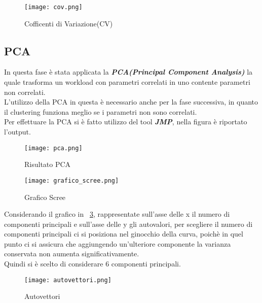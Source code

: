 \begin{figure}[!htbp]
	\texttt{[image: cov.png]}
  \caption{Cofficenti di Variazione(CV)}
  \label{}
\end{figure}

\subsection{PCA}
In questa fase è stata applicata la
\textbf{\textit{PCA(Principal Component Analysis)}}
la quale trasforma un workload con parametri correlati in uno contente parametri
non correlati.\\
L'utilizzo della PCA in questa è necessario anche per la fase successiva, in
quanto il clustering funziona meglio se i parametri non sono correlati.\\
Per effettuare la PCA si è fatto utilizzo del tool \textit{\textbf{JMP}}, nella
figura è riportato l'output.\\

\begin{figure}[!htbp]
	\texttt{[image: pca.png]}
  \caption{Risultato PCA}
  \label{}
\end{figure}

\begin{figure}[!htbp]
	\texttt{[image: grafico\_scree.png]}
  \caption{Grafico Scree}
  \label{grafico_scree}
\end{figure}

Considerando il grafico in \figurename~\ref{grafico_scree}, rappresentate
sull'asse delle x il numero di componenti principali e sull'asse delle y
gli autovalori, per scegliere il numero di componenti principali ci si
posiziona nel ginocchio della curva, poichè in quel punto ci si assicura che
aggiungendo un'ulteriore componente la varianza conservata non aumenta
significativamente.\\
Quindi si è scelto di considerare 6 componenti principali.\\

\begin{figure}[!htbp]
	\texttt{[image: autovettori.png]}
  \caption{Autovettori}
  \label{}
\end{figure}

